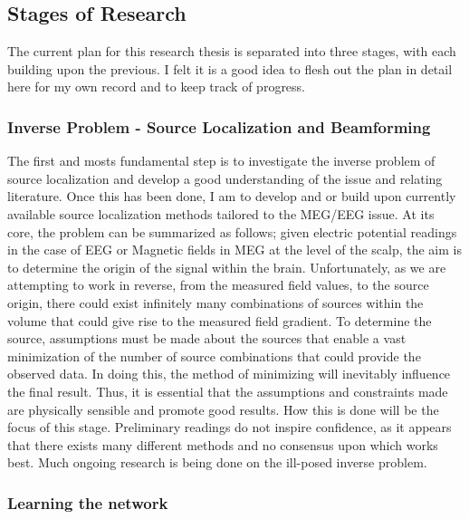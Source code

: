 \documentclass{article}
\begin{document}
\subsection{Stages of Research}
The current plan for this research thesis is separated into three stages, with each building upon the previous. I felt it is a good idea to flesh out the plan in detail here for my own record and to keep track of progress.
\subsubsection{Inverse Problem - Source Localization and Beamforming}
The first and mosts fundamental step is to investigate the inverse problem of source localization and develop a good understanding of the issue and relating literature. Once this has been done, I am to develop and or build upon currently available source localization methods tailored to the MEG/EEG issue. At its core, the problem can be summarized as follows; given electric potential readings in the case of EEG or Magnetic fields in MEG at the level of the scalp, the aim is to determine the origin of the signal within the brain. Unfortunately, as we are attempting to work in reverse, from the measured field values, to the source origin, there could exist infinitely many combinations of sources within the volume that could give rise to the measured field gradient. To determine the source, assumptions must be made about the sources that enable a vast minimization of the number of source combinations that could provide the observed data. In doing this, the method of minimizing will inevitably influence the final result. Thus, it is essential that the assumptions and constraints made are physically sensible and promote good results. How this is done will be the focus of this stage. Preliminary readings do not inspire confidence, as it appears that there exists many different methods and no consensus upon which works best. Much ongoing research is being done on the ill-posed inverse problem.

\subsubsection{Learning the network}

 
\end{document}
